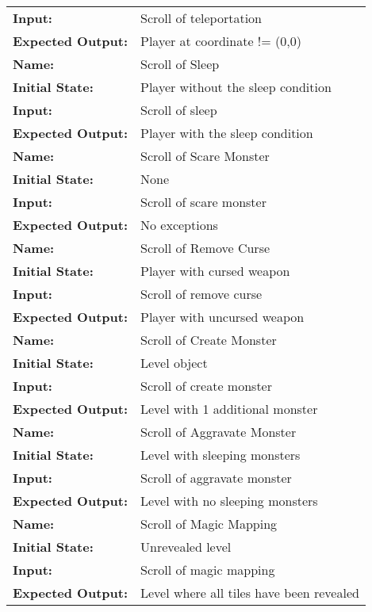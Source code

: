 \documentclass[12pt, titlepage]{article}
\begin{document}
\begin{center}
\begin{longtable}{ l | p{10cm} }
				\textbf{Input:} & Scroll of teleportation\\
				\textbf{Expected Output:} & Player at coordinate != (0,0)\\[1em]
				\hline
				\rule{0pt}{2em}\textbf{Name:} & Scroll of Sleep\\
				\textbf{Initial State:} & Player without the sleep condition\\
				\textbf{Input:} & Scroll of sleep\\
				\textbf{Expected Output:} & Player with the sleep condition\\[1em]
				\hline
				\rule{0pt}{2em}\textbf{Name:} & Scroll of Scare Monster\\
				\textbf{Initial State:} & None\\
				\textbf{Input:} & Scroll of scare monster\\
				\textbf{Expected Output:} & No exceptions\\[1em]
				\hline
				\rule{0pt}{2em}\textbf{Name:} & Scroll of Remove Curse\\
				\textbf{Initial State:} & Player with cursed weapon\\
				\textbf{Input:} & Scroll of remove curse\\
				\textbf{Expected Output:} & Player with uncursed weapon\\[1em]
				\hline
				\rule{0pt}{2em}\textbf{Name:} & Scroll of Create Monster\\
				\textbf{Initial State:} & Level object\\
				\textbf{Input:} & Scroll of create monster\\
				\textbf{Expected Output:} & Level with 1 additional monster\\[1em]
				\hline
				\rule{0pt}{2em}\textbf{Name:} & Scroll of Aggravate Monster\\
				\textbf{Initial State:} & Level with sleeping monsters\\
				\textbf{Input:} & Scroll of aggravate monster\\
				\textbf{Expected Output:} & Level with no sleeping monsters\\[1em]
				\hline
				\rule{0pt}{2em}\textbf{Name:} & Scroll of Magic Mapping\\
				\textbf{Initial State:} & Unrevealed level\\
				\textbf{Input:} & Scroll of magic mapping\\
				\textbf{Expected Output:} & Level where all tiles have been revealed\\[1em]

\end{longtable}
\end{center}
\end{document}
